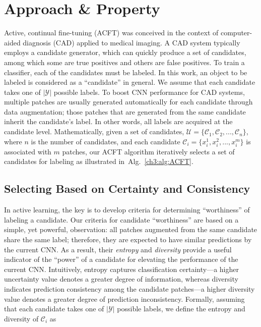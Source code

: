


\section{Approach \& Property}
\label{ch3:approach_property}



Active, continual fine-tuning (ACFT) was conceived in the context of computer-aided diagnosis (CAD) applied to medical imaging. A CAD system typically employs a candidate generator, which can quickly produce a set of candidates,  among which some are true positives and others are false positives. To train a classifier, each of the candidates must be labeled. In this work, an object to be labeled is considered as a ``candidate'' in general. We assume that each candidate takes one of $|\mathcal{Y}|$ possible labels.  To boost CNN performance for CAD systems, multiple patches are usually generated automatically for each candidate through data augmentation; those patches that are generated from the same candidate inherit the candidate's label. In other words, all labels are acquired at the candidate level. Mathematically, given a set of candidates, $\mathcal{U}=\{\mathcal{C}_1, \mathcal{C}_2, ..., \mathcal{C}_n\}$, where $n$ is the number of candidates, and each candidate $\mathcal{C}_i =\{x^{1}_i,x^{2}_i,...,x^{m}_i\}$ is associated with $m$ patches, our ACFT  algorithm iteratively selects a set of candidates for labeling as illustrated in~Alg.~\ref{ch3:alg:ACFT}.



\subsection{Selecting Based on Certainty and Consistency}
\label{ch3:approach_property:selection_certainty_consistency}

In active learning, the key is to develop criteria for determining ``worthiness'' of labeling a candidate. Our criteria for candidate ``worthiness'' are based on a simple, yet powerful, observation: all patches augmented from the same candidate share the same label; therefore, they are expected to have similar predictions by the current CNN. As a result, their {\em entropy} and {\em diversity} provide a useful indicator of the ``power'' of a candidate for elevating the performance of the current CNN. Intuitively, entropy captures classification certainty---a higher uncertainty value denotes a greater degree of information, whereas diversity indicates prediction consistency among the candidate patches---a higher diversity value denotes a greater degree of prediction inconsistency. Formally, assuming that each candidate takes one of $|\mathcal{Y}|$ possible labels, we define the entropy and diversity of $\mathcal{C}_i$ as

